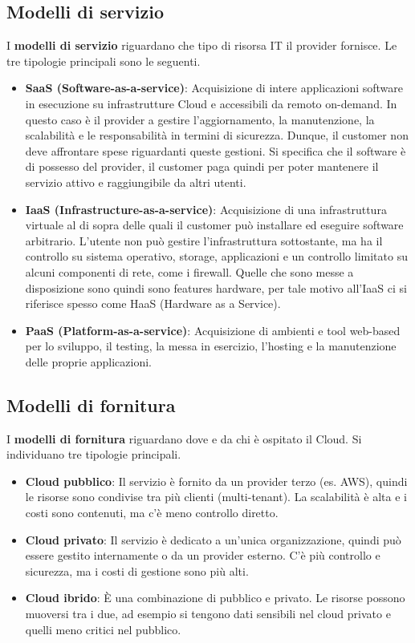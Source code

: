 \subsection{Modelli di servizio}
I \textbf{modelli di servizio} riguardano che tipo di risorsa IT il provider fornisce. Le tre tipologie principali sono le seguenti.
\begin{itemize}
	\item \textbf{SaaS (Software-as-a-service)}: Acquisizione di intere
	applicazioni software in esecuzione su infrastrutture Cloud e accessibili da remoto on-demand. In questo caso è il provider a gestire l’aggiornamento, la manutenzione, la
	scalabilità e le responsabilità in termini di sicurezza. Dunque, il customer non deve affrontare spese riguardanti queste gestioni. Si specifica che il software è di possesso del provider, il customer paga quindi per poter mantenere il servizio attivo e raggiungibile da altri utenti.
	\item \textbf{IaaS (Infrastructure-as-a-service)}: Acquisizione di una
	infrastruttura virtuale al di sopra delle quali il customer può installare ed eseguire software arbitrario. L’utente non può gestire l’infrastruttura sottostante, ma ha il
	controllo su sistema operativo, storage, applicazioni e un controllo limitato
	su alcuni componenti di rete, come i firewall. Quelle che sono messe a disposizione sono quindi sono features hardware, per tale motivo all’IaaS ci si riferisce spesso come
	HaaS (Hardware as a Service).
	\item \textbf{PaaS (Platform-as-a-service)}: Acquisizione di ambienti e
	tool web-based per lo sviluppo, il testing, la messa in
	esercizio, l’hosting e la manutenzione delle proprie
	applicazioni.
\end{itemize}

\subsection{Modelli di fornitura}
I \textbf{modelli di fornitura} riguardano dove e da chi è ospitato il Cloud. Si individuano tre tipologie principali.
\begin{itemize}
	\item \textbf{Cloud pubblico}: Il servizio è fornito da un provider terzo (es. AWS), quindi le risorse sono condivise tra più clienti (multi-tenant). La scalabilità è alta e i costi sono contenuti, ma c'è meno controllo diretto.
	\item \textbf{Cloud privato}: Il servizio è dedicato a un’unica organizzazione, quindi può essere gestito internamente o da un provider esterno. C'è più controllo e sicurezza, ma i costi di gestione sono più alti.
	\item \textbf{Cloud ibrido}: \MakeUppercase{è} una combinazione di pubblico e privato. Le risorse possono muoversi tra i due, ad esempio si tengono dati sensibili nel cloud privato e quelli meno critici nel pubblico.
\end{itemize}

